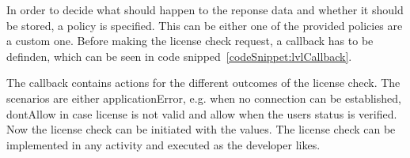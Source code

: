 In order to decide what should happen to the reponse data and whether it should be stored, a policy is specified.
This can be either one of the provided policies are a custom one.
Before making the license check request, a callback has to be definden, which can be seen in code snipped~\ref{codeSnippet:lvlCallback}.

The callback contains actions for the different outcomes of the license check.
The scenarios are either applicationError, e.g. when no connection can be established, dontAllow in case license is not valid and allow when the users status is verified.
Now the license check can be initiated with the values. \cite{developersLicensingSetup}\cite{developersLicensingAdding}
\newline
The license check can be implemented in any activity and executed as the developer likes.
